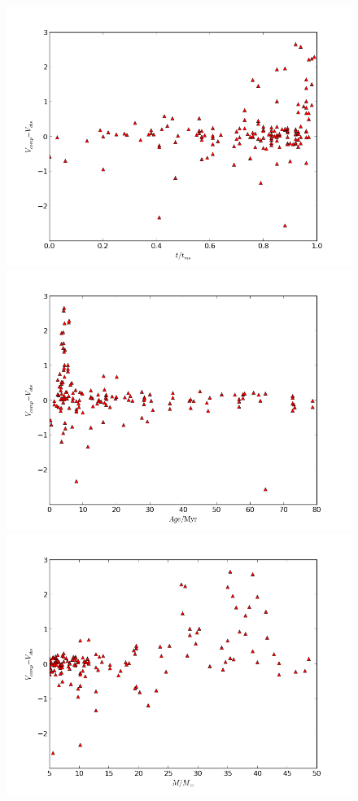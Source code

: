 \documentclass[a4paper,10pt]{article}
\begin{document}
 
  \begin{figure}[h!]
  \begin{minipage}{0.49\textwidth}
   \includegraphics[width=\textwidth]{diffmagfracms}
  \end{minipage}
  \begin{minipage}{0.49\textwidth}
   \includegraphics[width=\textwidth]{diffmagAge}
  \end{minipage}
  \begin{minipage}{0.49\textwidth}
   \includegraphics[width=\textwidth]{diffmagmass}

\end{minipage}
\end{figure}
\end{document}
